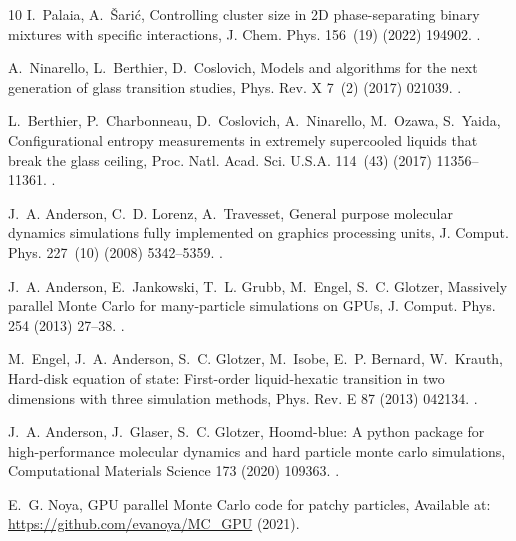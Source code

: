 \documentclass[final,5p,times,twocolumn]{elsarticle}
\begin{document}
\begin{thebibliography}{10}
I.~Palaia, A.~{\v{S}}ari{\'{c}}, Controlling cluster size in {2D}
  phase-separating binary mixtures with specific interactions, J. Chem. Phys.
  156~(19) (2022) 194902.
\newblock \href {https://doi.org/10.1063/5.0087769}
  {}.

A.~Ninarello, L.~Berthier, D.~Coslovich, Models and algorithms for the next
  generation of glass transition studies, Phys. Rev. X 7~(2) (2017) 021039.
\newblock \href {https://doi.org/10.1103/PhysRevX.7.021039}
  {}.

L.~Berthier, P.~Charbonneau, D.~Coslovich, A.~Ninarello, M.~Ozawa, S.~Yaida,
  Configurational entropy measurements in extremely supercooled liquids that
  break the glass ceiling, Proc. Natl. Acad. Sci. U.S.A. 114~(43) (2017)
  11356--11361.
\newblock \href {https://doi.org/10.1073/pnas.1706860114}
  {}.

J.~A. Anderson, C.~D. Lorenz, A.~Travesset, General purpose molecular dynamics
  simulations fully implemented on graphics processing units, J. Comput. Phys.
  227~(10) (2008) 5342--5359.
\newblock \href {https://doi.org/10.1016/j.jcp.2008.01.047}
  {}.

J.~A. Anderson, E.~Jankowski, T.~L. Grubb, M.~Engel, S.~C. Glotzer, Massively
  parallel {Monte Carlo} for many-particle simulations on {GPUs}, J. Comput.
  Phys. 254 (2013) 27--38.
\newblock \href {https://doi.org/10.1016/j.jcp.2013.07.023}
  {}.

M.~Engel, J.~A. Anderson, S.~C. Glotzer, M.~Isobe, E.~P. Bernard, W.~Krauth,
  Hard-disk equation of state: First-order liquid-hexatic transition in two
  dimensions with three simulation methods, Phys. Rev. E 87 (2013) 042134.
\newblock \href {https://doi.org/10.1103/PhysRevE.87.042134}
  {}.

J.~A. Anderson, J.~Glaser, S.~C. Glotzer, Hoomd-blue: A python package for
  high-performance molecular dynamics and hard particle monte carlo
  simulations, Computational Materials Science 173 (2020) 109363.
\newblock \href {https://doi.org/10.1016/j.commatsci.2019.109363}
  {}.

E.~G. Noya, {GPU parallel Monte Carlo code for patchy particles}, Available at:
  \url{https://github.com/evanoya/MC_GPU} (2021).


\end{thebibliography}
\end{document}
